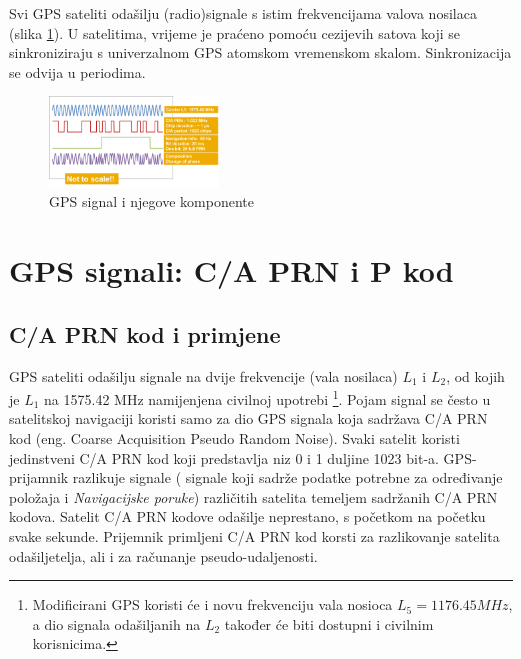 \documentclass[a4paper,twoside,12pt]{memoir} %
\begin{document}
	Svi GPS sateliti odašilju (radio)signale s istim frekvencijama valova nosilaca (slika \ref{Fig:GPSSignal}). 
	U satelitima, vrijeme je praćeno pomoću cezijevih satova koji se sinkroniziraju s univerzalnom GPS atomskom vremenskom skalom. Sinkronizacija se odvija u periodima.
	\begin{figure}[H]
		\centering
		\includegraphics[width=0.4\textwidth]{GPS_Signals}
		\caption{GPS signal i njegove komponente \cite{GPS:1}}
		\label{Fig:GPSSignal}
	\end{figure}
	
	\section[C/A PRN kod]{GPS signali: C/A PRN i P kod}
	\subsection{C/A PRN kod i primjene}\label{CAkod}
	GPS sateliti odašilju signale na dvije frekvencije (vala nosilaca) $L_1$ i $L_2$, od kojih je $L_1$ na 1575.42 MHz namijenjena civilnoj upotrebi \footnote{Modificirani GPS koristi će i novu frekvenciju vala nosioca $L_5=1176.45 MHz$, a dio signala odašiljanih na $L_2$ također će biti dostupni i civilnim korisnicima.}. Pojam signal se često u satelitskoj navigaciji
	koristi samo za dio GPS signala koja sadržava C/A PRN kod (eng. Coarse Acquisition Pseudo Random Noise). 
	Svaki satelit koristi jedinstveni C/A PRN kod koji predstavlja niz 0 i 1 duljine 1023 bit-a.
	GPS-prijamnik razlikuje signale ( signale koji sadrže podatke potrebne za određivanje položaja i \textit{Navigacijske poruke}) različitih satelita
	temeljem sadržanih C/A PRN kodova. Satelit C/A PRN kodove odašilje neprestano, s početkom na početku svake sekunde. Prijemnik primljeni C/A PRN kod korsti za 
	razlikovanje satelita odašiljetelja, ali i za računanje pseudo-udaljenosti.
	
\end{document}
